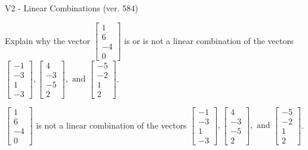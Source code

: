 \begin{exercise}
  \begin{exerciseTitle}V2 - Linear Combinations (ver. 584)\end{exerciseTitle}
  \begin{exerciseStatement}
    Explain why the vector \(\left[\begin{array}{c}
1 \\
6 \\
-4 \\
0
\end{array}\right]\)  is or is not a linear 
	combination of the vectors \(\left[\begin{array}{c}
-1 \\
-3 \\
1 \\
-3
\end{array}\right] , \left[\begin{array}{c}
4 \\
-3 \\
-5 \\
2
\end{array}\right] , \text{ and } \left[\begin{array}{c}
-5 \\
-2 \\
1 \\
2
\end{array}\right]\).
	


  \end{exerciseStatement}
  \begin{exerciseAnswer}
   \(\left[\begin{array}{c}
1 \\
6 \\
-4 \\
0
\end{array}\right]\) 
  	 is not  
	a linear combination of the vectors \(\left[\begin{array}{c}
-1 \\
-3 \\
1 \\
-3
\end{array}\right] , \left[\begin{array}{c}
4 \\
-3 \\
-5 \\
2
\end{array}\right] , \text{ and } \left[\begin{array}{c}
-5 \\
-2 \\
1 \\
2
\end{array}\right]\).

	
  


  \end{exerciseAnswer}
\end{exercise}